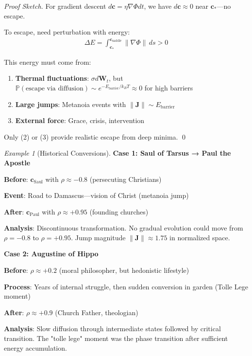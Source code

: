 \documentclass[11pt,a4paper]{article}
\theoremstyle{definition}
\theoremstyle{remark}
\newtheorem{example}{Example}[section]
\newcommand{\cc}{\mathbf{c}}
\begin{document}
\begin{enumerate}
\begin{proof}[Proof Sketch]
For gradient descent \(d\cc = \eta \nabla \Phi dt\), we have \(d\cc \approx 0\) near \(\cc_*\)—no escape.

To escape, need perturbation with energy:
\begin{align}
\Delta E = \int_{\cc_*}^{\cc_{\text{saddle}}} \|\nabla \Phi\| \, ds > 0
\end{align}

This energy must come from:
\begin{enumerate}
    \item \textbf{Thermal fluctuations}: \(\sigma d\mathbf{W}_t\), but \(\mathbb{P}(\text{escape via diffusion}) \sim e^{-E_{\text{barrier}}/k_B T} \approx 0\) for high barriers
    \item \textbf{Large jumps}: Metanoia events with \(\|\mathbf{J}\| \sim E_{\text{barrier}}\)
    \item \textbf{External force}: Grace, crisis, intervention
\end{enumerate}

Only (2) or (3) provide realistic escape from deep minima. \qed
\end{proof}

\begin{example}[Historical Conversions]
\textbf{Case 1: Saul of Tarsus → Paul the Apostle}

\textbf{Before}: \(\cc_{\text{Saul}}\) with \(\rho \approx -0.8\) (persecuting Christians)

\textbf{Event}: Road to Damascus—vision of Christ (metanoia jump)

\textbf{After}: \(\cc_{\text{Paul}}\) with \(\rho \approx +0.95\) (founding churches)

\textbf{Analysis}: Discontinuous transformation. No gradual evolution could move from \(\rho = -0.8\) to \(\rho = +0.95\). Jump magnitude \(\|\mathbf{J}\| \approx 1.75\) in normalized space.

\textbf{Case 2: Augustine of Hippo}

\textbf{Before}: \(\rho \approx +0.2\) (moral philosopher, but hedonistic lifestyle)

\textbf{Process}: Years of internal struggle, then sudden conversion in garden (Tolle Lege moment)

\textbf{After}: \(\rho \approx +0.9\) (Church Father, theologian)

\textbf{Analysis}: Slow diffusion through intermediate states followed by critical transition. The "tolle lege" moment was the phase transition after sufficient energy accumulation.


\end{example}
\end{enumerate}
\end{document}
